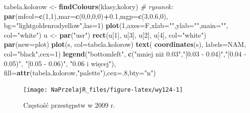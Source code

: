 \documentclass[polish,]{book}
\newenvironment{Shaded}{\begin{snugshade}}{\end{snugshade}}
\newcommand{\CommentTok}[1]{\textcolor[rgb]{0.56,0.35,0.01}{\textit{#1}}}
\newcommand{\DataTypeTok}[1]{\textcolor[rgb]{0.13,0.29,0.53}{#1}}
\newcommand{\DecValTok}[1]{\textcolor[rgb]{0.00,0.00,0.81}{#1}}
\newcommand{\FloatTok}[1]{\textcolor[rgb]{0.00,0.00,0.81}{#1}}
\newcommand{\KeywordTok}[1]{\textcolor[rgb]{0.13,0.29,0.53}{\textbf{#1}}}
\newcommand{\NormalTok}[1]{#1}
\newcommand{\OperatorTok}[1]{\textcolor[rgb]{0.81,0.36,0.00}{\textbf{#1}}}
\newcommand{\StringTok}[1]{\textcolor[rgb]{0.31,0.60,0.02}{#1}}
\begin{document}
\begin{Shaded}
\begin{Highlighting}[]
\NormalTok{tabela.kolorow <-}\StringTok{ }\KeywordTok{findColours}\NormalTok{(klasy,kolory)}
\CommentTok{# rysunek:}
\KeywordTok{par}\NormalTok{(}\DataTypeTok{mfcol=}\KeywordTok{c}\NormalTok{(}\DecValTok{1}\NormalTok{,}\DecValTok{1}\NormalTok{),}\DataTypeTok{mar=}\KeywordTok{c}\NormalTok{(}\DecValTok{0}\NormalTok{,}\DecValTok{0}\NormalTok{,}\DecValTok{0}\NormalTok{,}\DecValTok{0}\NormalTok{)}\OperatorTok{+}\FloatTok{0.1}\NormalTok{,}\DataTypeTok{mgp=}\KeywordTok{c}\NormalTok{(}\DecValTok{3}\NormalTok{,}\FloatTok{0.6}\NormalTok{,}\DecValTok{0}\NormalTok{),}
    \DataTypeTok{bg=}\StringTok{"lightgoldenrodyellow"}\NormalTok{,}\DataTypeTok{las=}\DecValTok{1}\NormalTok{)}
\KeywordTok{plot}\NormalTok{(}\DecValTok{1}\NormalTok{,}\DataTypeTok{axes=}\NormalTok{F,}\DataTypeTok{xlab=}\StringTok{""}\NormalTok{,}\DataTypeTok{ylab=}\StringTok{""}\NormalTok{,}\DataTypeTok{main=}\StringTok{""}\NormalTok{, }\DataTypeTok{col=}\StringTok{"white"}\NormalTok{)}
\NormalTok{u <-}\StringTok{ }\KeywordTok{par}\NormalTok{(}\StringTok{"usr"}\NormalTok{)}
\KeywordTok{rect}\NormalTok{(u[}\DecValTok{1}\NormalTok{], u[}\DecValTok{3}\NormalTok{], u[}\DecValTok{2}\NormalTok{], u[}\DecValTok{4}\NormalTok{], }\DataTypeTok{col=}\StringTok{"white"}\NormalTok{)}
\KeywordTok{par}\NormalTok{(}\DataTypeTok{new=}\NormalTok{plot)}
\KeywordTok{plot}\NormalTok{(s, }\DataTypeTok{col=}\NormalTok{tabela.kolorow)}
\KeywordTok{text}\NormalTok{( }\KeywordTok{coordinates}\NormalTok{(s), }\DataTypeTok{labels=}\NormalTok{NAM, }\DataTypeTok{col=}\StringTok{"black"}\NormalTok{,}\DataTypeTok{cex=}\DecValTok{1}\NormalTok{)}
\KeywordTok{legend}\NormalTok{(}\StringTok{"bottomleft"}\NormalTok{,}
       \KeywordTok{c}\NormalTok{(}\StringTok{"mniej niż 0.03"}\NormalTok{,}\StringTok{"[0.03 - 0.04)"}\NormalTok{,}\StringTok{"[0.04 - 0.05)"}\NormalTok{, }\StringTok{"[0.05 - 0.06)"}\NormalTok{, }\StringTok{"0.06 i więcej"}\NormalTok{),}
       \DataTypeTok{fill=}\KeywordTok{attr}\NormalTok{(tabela.kolorow,}\StringTok{"palette"}\NormalTok{),}\DataTypeTok{cex=}\NormalTok{.}\DecValTok{8}\NormalTok{,}\DataTypeTok{bty=}\StringTok{"n"}\NormalTok{)}
\end{Highlighting}
\end{Shaded}

\begin{figure}[h]

{\centering \texttt{[image: NaPrzelajR\_files/figure-latex/wy124-1]} 

}

\caption{Częstość przestępstw w 2009 r.}\label{fig:wy124}
\end{figure}
\end{document}

